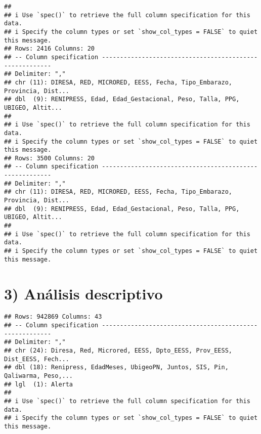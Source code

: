 \documentclass[
]{article}
\newenvironment{Shaded}{\begin{snugshade}}{\end{snugshade}}
\newcommand{\AttributeTok}[1]{\textcolor[rgb]{0.77,0.63,0.00}{#1}}
\newcommand{\DocumentationTok}[1]{\textcolor[rgb]{0.56,0.35,0.01}{\textbf{\textit{#1}}}}
\newcommand{\FunctionTok}[1]{\textcolor[rgb]{0.00,0.00,0.00}{#1}}
\newcommand{\NormalTok}[1]{#1}
\newcommand{\OtherTok}[1]{\textcolor[rgb]{0.56,0.35,0.01}{#1}}
\newcommand{\SpecialCharTok}[1]{\textcolor[rgb]{0.00,0.00,0.00}{#1}}
\newcommand{\StringTok}[1]{\textcolor[rgb]{0.31,0.60,0.02}{#1}}
\begin{document}
\begin{verbatim}
## 
## i Use `spec()` to retrieve the full column specification for this data.
## i Specify the column types or set `show_col_types = FALSE` to quiet this message.
## Rows: 2416 Columns: 20
## -- Column specification --------------------------------------------------------
## Delimiter: ","
## chr (11): DIRESA, RED, MICRORED, EESS, Fecha, Tipo_Embarazo, Provincia, Dist...
## dbl  (9): RENIPRESS, Edad, Edad_Gestacional, Peso, Talla, PPG, UBIGEO, Altit...
## 
## i Use `spec()` to retrieve the full column specification for this data.
## i Specify the column types or set `show_col_types = FALSE` to quiet this message.
## Rows: 3500 Columns: 20
## -- Column specification --------------------------------------------------------
## Delimiter: ","
## chr (11): DIRESA, RED, MICRORED, EESS, Fecha, Tipo_Embarazo, Provincia, Dist...
## dbl  (9): RENIPRESS, Edad, Edad_Gestacional, Peso, Talla, PPG, UBIGEO, Altit...
## 
## i Use `spec()` to retrieve the full column specification for this data.
## i Specify the column types or set `show_col_types = FALSE` to quiet this message.
\end{verbatim}

\begin{Shaded}
\end{Shaded}

\hypertarget{anuxe1lisis-descriptivo}{%
\section{3) Análisis descriptivo}\label{anuxe1lisis-descriptivo}}

\begin{verbatim}
## Rows: 942869 Columns: 43
## -- Column specification --------------------------------------------------------
## Delimiter: ","
## chr (24): Diresa, Red, Microred, EESS, Dpto_EESS, Prov_EESS, Dist_EESS, Fech...
## dbl (18): Renipress, EdadMeses, UbigeoPN, Juntos, SIS, Pin, Qaliwarma, Peso,...
## lgl  (1): Alerta
## 
## i Use `spec()` to retrieve the full column specification for this data.
## i Specify the column types or set `show_col_types = FALSE` to quiet this message.
\end{verbatim}
\end{document}
